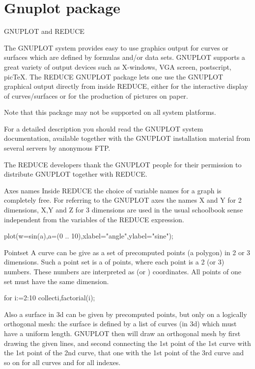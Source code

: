 \section{Gnuplot package}

\begin{Introduction}{GNUPLOT and REDUCE}

The GNUPLOT system provides easy to use graphics output
for curves or surfaces which are defined by
formulas and/or data sets. GNUPLOT supports
a great variety of output devices
such as X-windows, VGA screen, postscript, picTeX.
The REDUCE GNUPLOT package lets one use the GNUPLOT
graphical output directly from inside REDUCE, either for
the interactive display of curves/surfaces or for the production
of pictures on paper.

Note that this package may not be supported on all system
platforms.

For a detailed description you should read the GNUPLOT
system documentation, available together with the GNUPLOT
installation material from several servers by anonymous FTP.

The REDUCE developers thank the GNUPLOT people for their permission
to distribute GNUPLOT together with REDUCE.
\end{Introduction}

\begin{Concept}{Axes names}
Inside REDUCE the choice of variable names for a graph is completely
free. For referring to the GNUPLOT axes the names
X and Y for 2 dimensions, X,Y and Z for 3 dimensions are used
in the usual schoolbook sense independent from the variables of
the REDUCE expression.

\begin{Examples}
  plot(w=sin(a),a=(0 .. 10),xlabel="angle",ylabel="sine");
\end{Examples}

\end{Concept}

\begin{Type}{Pointset}
A curve can be give as a set of precomputed points (a polygon)
in 2 or 3 dimensions. Such a point set is a 
of points, where each point is a  2 (or 3)
numbers. These numbers are interpreted as 
(or ) coordinates. All points of one set must have
the same dimension.

\begin{Examples}
 for i:=2:10 collect{i,factorial(i)};

\end{Examples}

Also a surface in 3d can be given by precomputed points,
but only on a logically orthogonal mesh: the surface is defined
by a list of curves (in 3d) which must have a uniform length.
GNUPLOT then will draw an orthogonal mesh by first drawing the
given lines, and second connecting the 1st point of the 1st curve
with the 1st point of the 2nd curve, that one with the 1st point
of the 3rd curve and so on for all curves and for all indexes.


\end{Type}


